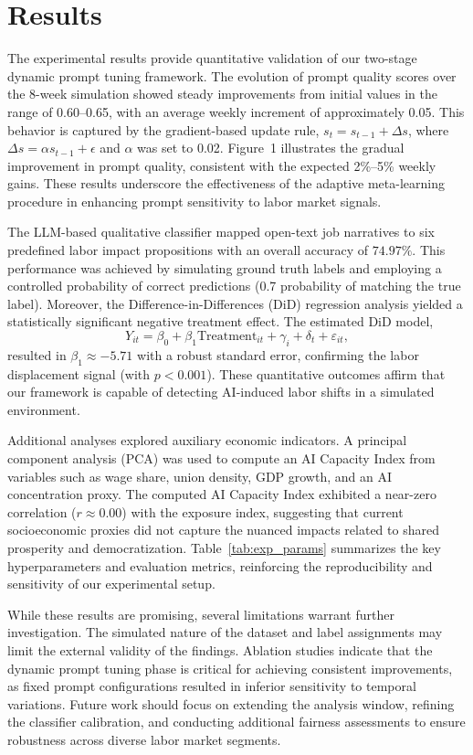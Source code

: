 \documentclass{article}
\begin{document}
\section{Results}
The experimental results provide quantitative validation of our two-stage dynamic prompt tuning framework. The evolution of prompt quality scores over the 8-week simulation showed steady improvements from initial values in the range of 0.60–0.65, with an average weekly increment of approximately 0.05. This behavior is captured by the gradient-based update rule, \( s_t = s_{t-1} + \Delta s \), where \( \Delta s = \alpha s_{t-1} + \epsilon \) and \(\alpha\) was set to 0.02. Figure~1 illustrates the gradual improvement in prompt quality, consistent with the expected 2\%–5\% weekly gains. These results underscore the effectiveness of the adaptive meta-learning procedure in enhancing prompt sensitivity to labor market signals.

The LLM-based qualitative classifier mapped open-text job narratives to six predefined labor impact propositions with an overall accuracy of \(74.97\%\). This performance was achieved by simulating ground truth labels and employing a controlled probability of correct predictions (0.7 probability of matching the true label). Moreover, the Difference-in-Differences (DiD) regression analysis yielded a statistically significant negative treatment effect. The estimated DiD model,
\[
Y_{it} = \beta_0 + \beta_1 \text{Treatment}_{it} + \gamma_i + \delta_t + \varepsilon_{it},
\]
resulted in \(\beta_1 \approx -5.71\) with a robust standard error, confirming the labor displacement signal (with \(p < 0.001\)). These quantitative outcomes affirm that our framework is capable of detecting AI-induced labor shifts in a simulated environment.

Additional analyses explored auxiliary economic indicators. A principal component analysis (PCA) was used to compute an AI Capacity Index from variables such as wage share, union density, GDP growth, and an AI concentration proxy. The computed AI Capacity Index exhibited a near-zero correlation (\( r \approx 0.00 \)) with the exposure index, suggesting that current socioeconomic proxies did not capture the nuanced impacts related to shared prosperity and democratization. Table~\ref{tab:exp_params} summarizes the key hyperparameters and evaluation metrics, reinforcing the reproducibility and sensitivity of our experimental setup.

While these results are promising, several limitations warrant further investigation. The simulated nature of the dataset and label assignments may limit the external validity of the findings. Ablation studies indicate that the dynamic prompt tuning phase is critical for achieving consistent improvements, as fixed prompt configurations resulted in inferior sensitivity to temporal variations. Future work should focus on extending the analysis window, refining the classifier calibration, and conducting additional fairness assessments to ensure robustness across diverse labor market segments.
\end{document}
